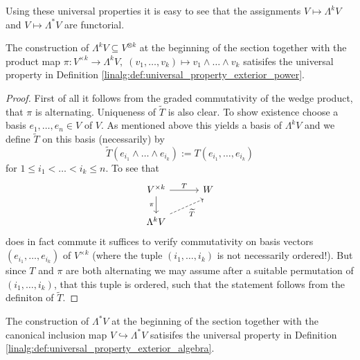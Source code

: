 \begin{remark}
    Using these universal properties it is easy to see that the assignments $V \mapsto \Lambda^k V$ and $V \mapsto \Lambda^\ast V$ are functorial.
\end{remark}

\begin{lemma}
    \label{linalg:lem:universal_property_exterior_power}
    The construction of $\Lambda^k V \subseteq V^{\otimes k}$ at the beginning of the section together with the product map $\pi \colon V^{\times k} \to \Lambda^k V, \; (v_1, \ldots, v_k) \mapsto v_1 \wedge \ldots \wedge v_k$ satisifes the universal property in Definition \ref{linalg:def:universal_property_exterior_power}.
\end{lemma}

\begin{proof}
    First of all it follows from the graded commutativity of the wedge product, that $\pi$ is alternating. Uniqueness of $\widetilde{T}$ is also clear. To show existence choose a basis $e_1,\ldots,e_n \in V$ of $V$. As mentioned above this yields a basis of $\Lambda^kV$ and we define $\widetilde{T}$ on this basis (necessarily) by 
    \[
    \widetilde{T}(e_{i_1} \wedge \ldots \wedge e_{i_k}) := T(e_{i_1},  \ldots, e_{i_k})
    \]
    for $1 \leq i_1 < \ldots < i_k \leq n$. To see that 
    \[\begin{tikzcd}[column sep = 3em]
	{V^{\times k}} & W \\
	{\Lambda^k V}
	\arrow["T", from=1-1, to=1-2]
	\arrow["\pi"', from=1-1, to=2-1]
	\arrow["\widetilde{T}"', dashed, end anchor = {[xshift = 5, yshift = -3]}, from=2-1, to=1-2]
\end{tikzcd}\]
does in fact commute it suffices to verify commutativity on basis vectors $(e_{i_1}, \ldots, e_{i_k})$ of $V^{\times k}$ (where the tuple $(i_1,\ldots,i_k)$ is not necessarily ordered!). But since $T$ and $\pi$ are both alternating we may assume after a suitable permutation of $(i_1,\ldots,i_k)$, that this tuple is ordered, such that the statement follows from the definiton of $\widetilde{T}$.
\end{proof}

\begin{lemma}
    The construction of $\Lambda^\ast V$ at the beginning of the section together with the canonical inclusion map $V \hookrightarrow \Lambda^\ast V$ satisifes the universal property in Definition \ref{linalg:def:universal_property_exterior_algebra}.
\end{lemma}

